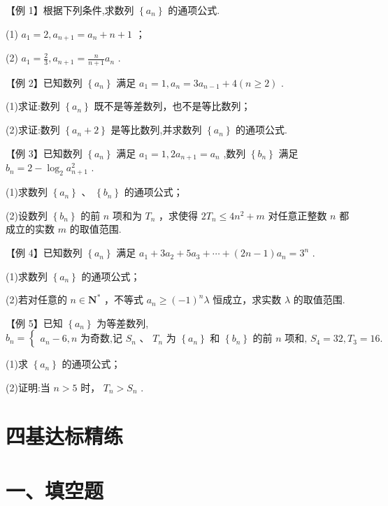 【例 1】根据下列条件,求数列 $\left\{  {a}_{n}\right\}$ 的通项公式.

(1) ${a}_{1} = 2,{a}_{n + 1} = {a}_{n} + n + 1$ ；

(2) ${a}_{1} = \frac{2}{3},{a}_{n + 1} = \frac{n}{n + 1}{a}_{n}$ .

【例 2】已知数列 $\left\{  {a}_{n}\right\}$ 满足 ${a}_{1} = 1,{a}_{n} = 3{a}_{n - 1} + 4\left( {n \geq  2}\right)$ .

(1)求证:数列 $\left\{  {a}_{n}\right\}$ 既不是等差数列，也不是等比数列；

(2)求证:数列 $\left\{  {{a}_{n} + 2}\right\}$ 是等比数列,并求数列 $\left\{  {a}_{n}\right\}$ 的通项公式.

【例 3】已知数列 $\left\{  {a}_{n}\right\}$ 满足 ${a}_{1} = 1,2{a}_{n + 1} = {a}_{n}$ ,数列 $\left\{  {b}_{n}\right\}$ 满足 ${b}_{n} = 2 - {\log }_{2}{a}_{n + 1}^{2}$ .

(1)求数列 $\left\{  {a}_{n}\right\}$ 、 $\left\{  {b}_{n}\right\}$ 的通项公式；

(2)设数列 $\left\{  {b}_{n}\right\}$ 的前 $n$ 项和为 ${T}_{n}$ ，求使得 $2{T}_{n} \leq  4{n}^{2} + m$ 对任意正整数 $n$ 都成立的实数 $m$ 的取值范围.

【例 4】已知数列 $\left\{  {a}_{n}\right\}$ 满足 ${a}_{1} + 3{a}_{2} + 5{a}_{3} + \cdots  + \left( {{2n} - 1}\right) {a}_{n} = {3}^{n}$ .

(1)求数列 $\left\{  {a}_{n}\right\}$ 的通项公式；

(2)若对任意的 $n \in  {\mathbf{N}}^{ * }$ ，不等式 ${a}_{n} \geq  {\left( -1\right) }^{n}\lambda$ 恒成立，求实数 $\lambda$ 的取值范围.

【例 5】已知 $\left\{  {a}_{n}\right\}$ 为等差数列, ${b}_{n} = \left\{  \begin{array}{l} {a}_{n} - 6,n\text{ 为奇数,记 }{S}_{n}\text{ 、 }{T}_{n}\text{ 为 }\left\{  {a}_{n}\right\}  \text{ 和 }\left\{  {b}_{n}\right\}  \text{ 的前 }n\text{ 项和, }{S}_{4} = {32},{T}_{3} = {16}. \end{array}\right.$

(1)求 $\left\{  {a}_{n}\right\}$ 的通项公式；

(2)证明:当 $n > 5$ 时， ${T}_{n} > {S}_{n}$ .

\section*{四基达标精练}

\section*{一、填空题}

